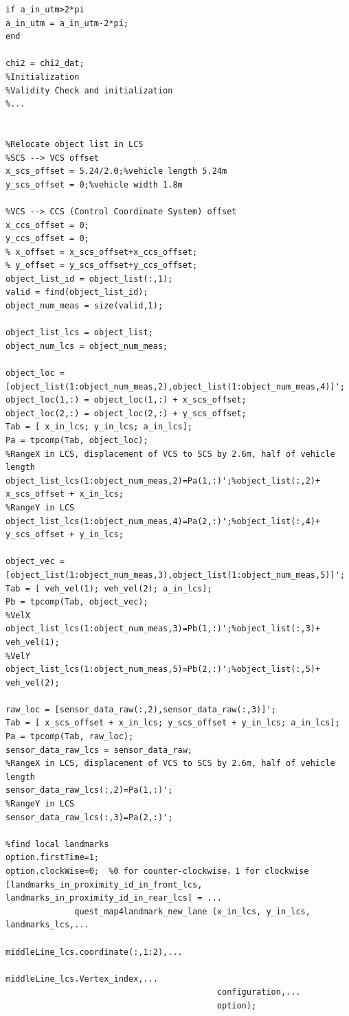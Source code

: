 \documentclass[12pt,a4paper]{article}
\begin{document}
\begin{verbatim}
if a_in_utm>2*pi
a_in_utm = a_in_utm-2*pi;
end

chi2 = chi2_dat;
%Initialization
%Validity Check and initialization
%...


%Relocate object list in LCS
%SCS --> VCS offset 
x_scs_offset = 5.24/2.0;%vehicle length 5.24m
y_scs_offset = 0;%vehicle width 1.8m

%VCS --> CCS (Control Coordinate System) offset 
x_ccs_offset = 0;
y_ccs_offset = 0;
% x_offset = x_scs_offset+x_ccs_offset;
% y_offset = y_scs_offset+y_ccs_offset;
object_list_id = object_list(:,1);
valid = find(object_list_id);
object_num_meas = size(valid,1);

object_list_lcs = object_list;
object_num_lcs = object_num_meas;

object_loc = [object_list(1:object_num_meas,2),object_list(1:object_num_meas,4)]';
object_loc(1,:) = object_loc(1,:) + x_scs_offset;
object_loc(2,:) = object_loc(2,:) + y_scs_offset;
Tab = [ x_in_lcs; y_in_lcs; a_in_lcs];
Pa = tpcomp(Tab, object_loc);
%RangeX in LCS, displacement of VCS to SCS by 2.6m, half of vehicle length
object_list_lcs(1:object_num_meas,2)=Pa(1,:)';%object_list(:,2)+ x_scs_offset + x_in_lcs;
%RangeY in LCS
object_list_lcs(1:object_num_meas,4)=Pa(2,:)';%object_list(:,4)+ y_scs_offset + y_in_lcs;

object_vec = [object_list(1:object_num_meas,3),object_list(1:object_num_meas,5)]';
Tab = [ veh_vel(1); veh_vel(2); a_in_lcs];
Pb = tpcomp(Tab, object_vec);
%VelX
object_list_lcs(1:object_num_meas,3)=Pb(1,:)';%object_list(:,3)+ veh_vel(1);
%VelY
object_list_lcs(1:object_num_meas,5)=Pb(2,:)';%object_list(:,5)+ veh_vel(2);    

raw_loc = [sensor_data_raw(:,2),sensor_data_raw(:,3)]';
Tab = [ x_scs_offset + x_in_lcs; y_scs_offset + y_in_lcs; a_in_lcs];
Pa = tpcomp(Tab, raw_loc);
sensor_data_raw_lcs = sensor_data_raw;
%RangeX in LCS, displacement of VCS to SCS by 2.6m, half of vehicle length
sensor_data_raw_lcs(:,2)=Pa(1,:)';
%RangeY in LCS
sensor_data_raw_lcs(:,3)=Pa(2,:)';

%find local landmarks
option.firstTime=1;
option.clockWise=0;  %0 for counter-clockwise，1 for clockwise    
[landmarks_in_proximity_id_in_front_lcs, landmarks_in_proximity_id_in_rear_lcs] = ...
              quest_map4landmark_new_lane (x_in_lcs, y_in_lcs, landmarks_lcs,...
                                           middleLine_lcs.coordinate(:,1:2),...
                                           middleLine_lcs.Vertex_index,...
                                           configuration,...
                                           option);




\end{verbatim}
\end{document}

